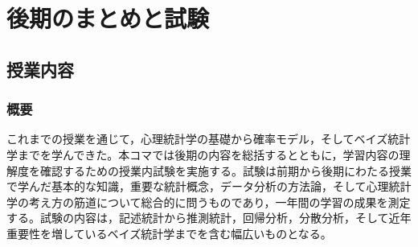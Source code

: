 \section{後期のまとめと試験}
\label{b30_final_exam}

\subsection{授業内容}

\subsubsection{概要}
これまでの授業を通じて，心理統計学の基礎から確率モデル，そしてベイズ統計学までを学んできた。本コマでは後期の内容を総括するとともに，学習内容の理解度を確認するための授業内試験を実施する。試験は前期から後期にわたる授業で学んだ基本的な知識，重要な統計概念，データ分析の方法論，そして心理統計学の考え方の筋道について総合的に問うものであり，一年間の学習の成果を測定する。試験の内容は，記述統計から推測統計，回帰分析，分散分析，そして近年重要性を増しているベイズ統計学までを含む幅広いものとなる。

